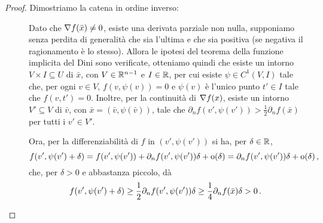 \begin{proof}
	Dimostriamo la catena in ordine inverso:
	\begin{description}
		\item [] Dato che $\nabla f(\bar x)\neq 0$, esiste una derivata parziale non nulla, supponiamo senza perdita
			di generalità che sia l'ultima e che sia positiva (se negativa il ragionamento è lo stesso).
			Allora le ipotesi del teorema della funzione implicita del Dini sono verificate, otteniamo quindi
			che esiste un intorno $V\times I\subseteq U$ di $\bar x$, con $V\in\mathbb R^{n-1}$ e $I\in\mathbb R$, per cui esiste $\psi\in C^1(V,I)$ tale che, per ogni $v\in V$, $f(v,\psi(v))=0$ e $\psi(v)$
			è l'unico punto $t'\in I$ tale che $f(v,t')=0$.
			Inoltre, per la continuità di $\nabla f(x)$, esiste un intorno $V'\subseteq V$ di $\bar v$, con $\bar x=(\bar v, \psi(\bar v))$, tale che $\partial_n f(v',\psi(v'))>\frac{1}{2}
			\partial_n f(\bar x)$ per tutti i $v'\in V'$. 
			
			Ora, per la differenziabilità di $f$ in $(v',\psi(v'))$ si ha, per $\delta\in \mathbb R$,
			\[
				f(v',\psi(v')+\delta)=f(v', \psi(v'))+\partial_n f(v',\psi(v'))\delta+\mathrm{o}(\delta)=\partial_n f(v',\psi(v'))\delta+\mathrm{o}(\delta)\, \text{, }
			\]
			che, per $\delta>0$ e abbastanza piccolo, dà
			\begin{equation*}
				f(v',\psi(v')+\delta)\ge \frac{1}{2}\partial_n f(v',\psi(v'))\delta\ge \frac{1}{4}\partial_n f(\bar x)\delta>0\, \text{. }
			\end{equation*}
			

\end{description}
\end{proof}

